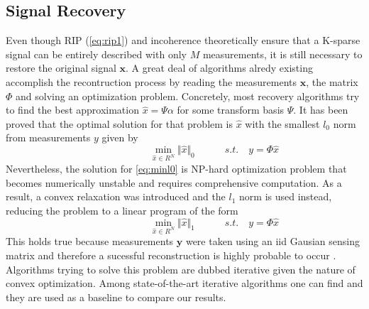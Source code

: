 \subsection{Signal Recovery}
Even though RIP (\ref{eq:rip1}) and incoherence theoretically ensure that a K-sparse signal can be entirely described with only $M$ measurements, it is still necessary to restore the original signal $\mathbf{x}$. A great deal of algorithms alredy existing accomplish the recontruction process by reading the measurements $\mathbf{x}$, the matrix  $\Phi$ and solving an optimization problem. Concretely, most recovery algorithms try to find the best approximation $\hat{x} = \Psi \alpha$ for some transform basis $\Psi$. It has been proved \cite{candes2006near,Donoho01} that the optimal solution for that problem is $\hat{x}$ with the smallest $l_0$ norm from measurements $y$ given by         
\begin{equation} \label{eq:minl0}
\hspace{3em} \hspace{3em} \hspace{3em}  \min_{ \hat{x} \in R^{N}} \Vert  \hat{x} \Vert_0 \hspace{3em} s.t. \enspace \enspace y = \Phi \hat{x}     \hspace{3em}
\end{equation}     
Nevertheless, the solution for \ref{eq:minl0} is NP-hard optimization problem that becomes numerically unstable and requires comprehensive computation. As a result, a convex relaxation was introduced and the $l_1$ norm is used instead, reducing the problem to a linear program of the form 
\begin{equation} \label{eq:minl1}
\hspace{3em} \hspace{3em} \hspace{3em}  \min_{ \hat{x} \in R^{N}} \Vert  \hat{x} \Vert_1 \hspace{3em} s.t. \enspace \enspace y = \Phi \hat{x}     \hspace{3em}
\end{equation}
This holds true because measurements $\mathbf{y}$ were taken using an iid Gausian sensing matrix and therefore a sucessful reconstruction is highly probable to occur \cite{Donoho01,candes2006robust}. Algorithms trying to solve this problem are dubbed iterative given the nature of convex optimization. Among state-of-the-art iterative algorithms one can find \cite{dong2014compressive,li2013efficient,metzler2014denoising} and they are used as a baseline to compare our results.  \

